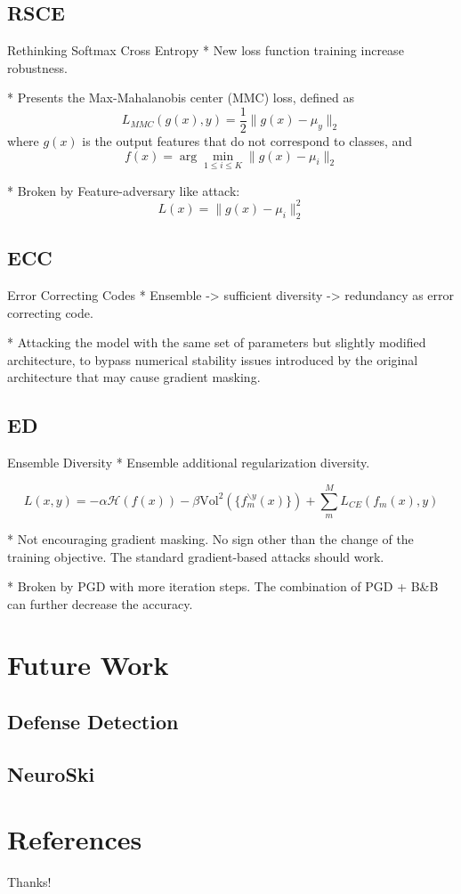 \documentclass[12,times]{beamer}
\begin{document}
\subsection{RSCE}
\begin{frame}{Rethinking Softmax Cross Entropy}
	* New loss function \textrightarrow training 
	\textrightarrow increase robustness.
	
	* Presents the Max-Mahalanobis center (MMC) loss, defined as
	$$ L_{MMC}(g(x),y) = \frac{1}{2} \| g(x) - \mu_y \|_2 $$
	where $g(x)$ is the output features that do not correspond to classes, and $$f(x)=\arg\min_{1\leq i \leq K}
	\|g(x)-\mu_i \|_2$$
	
	* Broken by Feature-adversary like attack: 
	$$L(x) = \|g(x) - \mu_i \|_2^2 $$
	
\end{frame}

\subsection{ECC}
\begin{frame}{Error Correcting Codes}
	* Ensemble -> sufficient diversity -> redundancy as error correcting code.
	
	* Attacking the model with the same set of parameters but
	slightly modified architecture, to bypass numerical stability issues introduced by the original architecture
	that may cause gradient masking.
\end{frame}

\subsection{ED}
\begin{frame}{Ensemble Diversity}
	* Ensemble \textrightarrow additional regularization
	\textrightarrow diversity.
	
	$$ L(x,y) = -\alpha\mathcal{H}(f(x)) 
	- \beta \text{Vol}^2(\{f_m^{\backslash y} (x)\})
	+ \sum_{m}^M L_{CE}(f_m(x), y)$$
	
	* Not encouraging gradient masking. No sign other than
	the change of the training objective. The standard
	gradient-based attacks should work.
	
	* Broken by PGD with more iteration steps. The combination
	of PGD + B\&B can further decrease the accuracy.
\end{frame} 

\section{Future Work}

\subsection{Defense Detection}

\subsection{NeuroSki}

\section{References}

\begin{frame}{Thanks!}
\end{frame}
\end{document}
